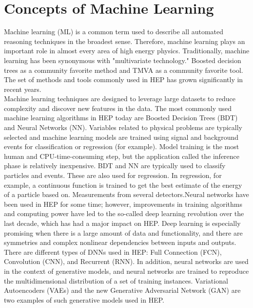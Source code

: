 \chapter{\label{ML}Concepts of Machine Learning}

Machine learning (ML) is a common term used to describe all automated reasoning techniques in the broadest sense. Therefore, machine learning plays an important role in almost every area of high energy physics. Traditionally, machine learning has been synonymous with "multivariate technology."  Boosted decision trees as a community favorite method and TMVA  as a community favorite tool. The set of methods and tools commonly used in HEP has grown significantly in recent years\cite{https://doi.org/10.48550/arxiv.2102.02770}. \\
Machine learning techniques are designed to leverage large datasets  to reduce complexity and discover new features in the data. The  most commonly used machine learning algorithms in HEP today are Boosted Decision Trees (BDT) and Neural Networks (NN). Variables related to physical problems are typically selected and  machine learning models are trained  using signal and background events for classification or regression (for example). Model training is the most human and CPU-time-consuming step, but the application called the  inference phase is relatively inexpensive. BDT and NN are typically used to classify particles and events. These are also used for regression. In regression, for example, a continuous function is trained to get the best estimate of the energy of a particle based on.  Measurements from several detectors.Neural networks have been used in HEP for some time; however, improvements in training algorithms and computing power have led to the so-called deep learning revolution over the last decade, which has had a major impact on HEP\cite{https://doi.org/10.48550/arxiv.2102.02770}. Deep learning is especially promising when there is a large amount of data and functionality, and there are symmetries and complex nonlinear dependencies between inputs and outputs. There are different types of DNNs used in HEP: Full Connection (FCN), Convolution (CNN), and Recurrent (RNN). In addition, neural networks are used in the context of generative models, and neural networks are trained to reproduce the multidimensional distribution of a set of training instances. Variational Autoencoders (VAEs) and the new Generative Adversarial Network (GAN) are two examples of such generative models used in HEP.
